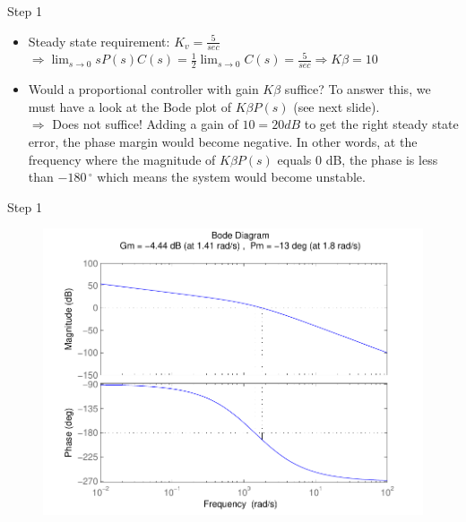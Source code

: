 \begin{frame}
\begin{exampleblock}{Step 1}
	\begin{itemize}
	\item Steady state requirement: $K_v = \frac{5}{sec}$ \\
	$\Rightarrow \lim_{s \to 0} sP(s)C(s) = \frac{1}{2}\lim_{s \to 0} C(s) = \frac{5}{sec} \Rightarrow K\beta = 10$
	\item Would a proportional controller with gain $K\beta$ suffice? To answer this, we must have a look at the Bode plot of $K\beta P(s)$ (see next slide). \\
	$\Rightarrow$ Does not suffice! Adding a gain of $10 = 20 dB$ to get the right steady state error, the phase margin would become negative. In other words, at the frequency where the magnitude of $K\beta P(s)$ equals 0 dB, the phase is less than $-180\,^{\circ}$ which means the system would become unstable.
	\end{itemize}
\end{exampleblock}
\end{frame}

\begin{frame}
\begin{exampleblock}{Step 1}
\begin{figure}
	\centering
	\includegraphics[width=0.6
	\linewidth]{lagstep1better}
\end{figure}	
\end{exampleblock}
\end{frame}

